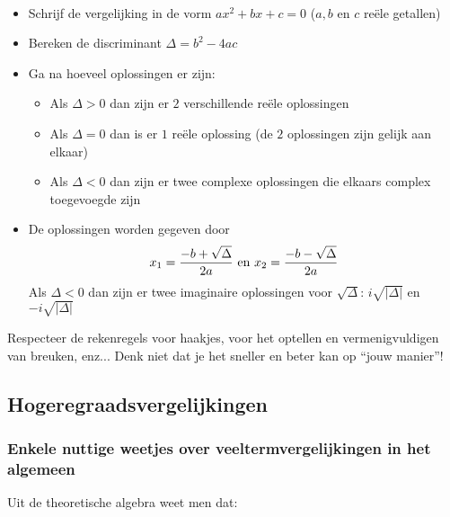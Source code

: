\begin{ftonthoud}
	\ \\
\begin{itemize}
\item Schrijf de vergelijking in de vorm $ax^2 + bx + c = 0$ ($a,b$ en $c$ re\"{e}le getallen)
\item Bereken de discriminant $\Delta = b^2 - 4ac$
\item Ga na hoeveel oplossingen er zijn:
        \begin{itemize} \item Als $\Delta >0$ dan zijn er $2$ verschillende re\"{e}le oplossingen \item Als $\Delta=0$ dan is er $1$ re\"{e}le oplossing (de $2$ oplossingen zijn gelijk aan elkaar) \item Als $\Delta <0$ dan zijn er twee complexe oplossingen die elkaars complex toegevoegde zijn \end{itemize}
\item De oplossingen worden gegeven door
\[ x_{1}=\frac{-b + \sqrt{\Delta}}{2a} \textup{  en  } x_{2}=\frac{-b - \sqrt{\Delta}}{2a} \] 
Als $\Delta <0$ dan zijn er twee imaginaire oplossingen voor $\sqrt{\Delta}$: $i\sqrt{|\Delta|}$ en $-i\sqrt{|\Delta|}$ 
\end{itemize}

\begin{opmerking}
	Respecteer de rekenregels voor haakjes, voor het optellen en vermenigvuldigen van breuken, enz...  Denk niet dat je het sneller en beter kan op ``jouw manier''!
\end{opmerking}


\end{ftonthoud}

\subsection{Hogeregraadsvergelijkingen}

\subsubsection{Enkele nuttige weetjes over veeltermvergelijkingen in het algemeen}

Uit de theoretische algebra weet men dat:

